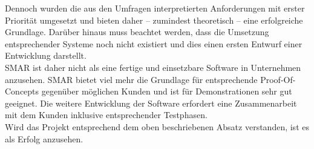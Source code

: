 Dennoch wurden die aus den Umfragen interpretierten Anforderungen mit erster Priorität umgesetzt und bieten daher -- zumindest theoretisch -- eine erfolgreiche Grundlage. Darüber hinaus muss beachtet werden, dass die Umsetzung entsprechender Systeme noch nicht existiert und dies einen ersten Entwurf einer Entwicklung darstellt.\\

\ac{SMAR} ist daher nicht als eine fertige und einsetzbare Software in Unternehmen anzusehen. \ac{SMAR} bietet viel mehr die Grundlage für entsprechende Proof-Of-Concepts gegenüber möglichen Kunden und ist für Demonstrationen sehr gut geeignet. Die weitere Entwicklung der Software erfordert eine Zusammenarbeit mit dem Kunden inklusive entsprechender Testphasen.\\

Wird das Projekt entsprechend dem oben beschriebenen Absatz verstanden, ist es als Erfolg anzusehen.
